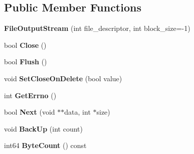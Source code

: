 \subsection*{Public Member Functions}
\begin{DoxyCompactItemize}
\item 
\mbox{\label{classgoogle_1_1protobuf_1_1io_1_1FileOutputStream_ab62426c6698a544ad834be97d7c7d4d7}} 
{\bfseries File\+Output\+Stream} (int file\+\_\+descriptor, int block\+\_\+size=-\/1)
\item 
\mbox{\label{classgoogle_1_1protobuf_1_1io_1_1FileOutputStream_ad2dcfcaebbbc5d49cd77e185caad4aaf}} 
bool {\bfseries Close} ()
\item 
\mbox{\label{classgoogle_1_1protobuf_1_1io_1_1FileOutputStream_a78821af5c5606631ef6a2687f8140d22}} 
bool {\bfseries Flush} ()
\item 
\mbox{\label{classgoogle_1_1protobuf_1_1io_1_1FileOutputStream_a5ced518b86cd67107ed266e3cf47db14}} 
void {\bfseries Set\+Close\+On\+Delete} (bool value)
\item 
\mbox{\label{classgoogle_1_1protobuf_1_1io_1_1FileOutputStream_aad2b395504939b7ca0eb0dc06c28f5ed}} 
int {\bfseries Get\+Errno} ()
\item 
\mbox{\label{classgoogle_1_1protobuf_1_1io_1_1FileOutputStream_a1378d8b7849707c69b4c08579d8066f6}} 
bool {\bfseries Next} (void $\ast$$\ast$data, int $\ast$size)
\item 
\mbox{\label{classgoogle_1_1protobuf_1_1io_1_1FileOutputStream_af699e96efac6f9b324fb5619f684f6ad}} 
void {\bfseries Back\+Up} (int count)
\item 
\mbox{\label{classgoogle_1_1protobuf_1_1io_1_1FileOutputStream_ad73a82a6cf38e632f3e52a9099901758}} 
int64 {\bfseries Byte\+Count} () const
\item 
$$
\end{DoxyCompactItemize}
